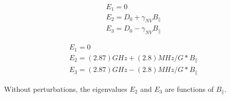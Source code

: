 \begin{align*}
E_1 = 0 \\
E_2 = D_0 + \gamma_{NV}B_\parallel\\
E_3 = D_0 - \gamma_{NV}B_\parallel
\end{align*}

\begin{align*}
E_1 = 0 \\
E_2 = (2.87)GHz + (2.8) MHz/G *B_\parallel\\
E_3 = (2.87)GHz - (2.8) MHz/G *B_\parallel
\end{align*}

Without perturbations, the eigenvalues $E_2$ and $E_3$ are functions of $B_\parallel$. 
